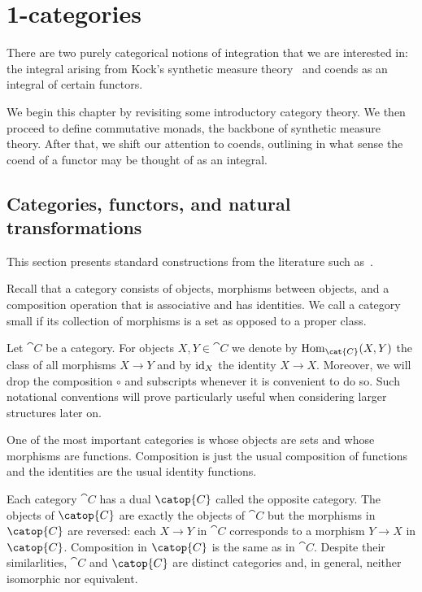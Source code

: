 \chapter{1-categories}\label{sec:synthetic_measure_theory_and_presheaves}

There are two purely categorical notions of integration that we are interested
in: the integral arising from Kock's synthetic measure theory~\cite{kock2011}
and coends as an integral of certain functors.

We begin this chapter by revisiting some introductory category theory. We then
proceed to define commutative monads, the backbone of synthetic measure theory.
After that, we shift our attention to coends, outlining in what sense the coend
of a functor may be thought of as an integral.

\section{Categories, functors, and natural transformations}\label{sec:categories}

This section presents standard constructions from the literature such as~\cite{maclane1997}.

Recall that a category consists of objects, morphisms between objects, and a
composition operation that is associative and has identities. We call a
category small if its collection of morphisms is a set as opposed to a proper
class.

Let $\cat{C}$ be a category. For objects $X,Y\in\cat{C}$ we denote by
$\Hom_{\cat{C}}(X,Y)$ the class of all morphisms $X\to Y$ and by $\operatorname{id}_X$ the
identity $X\to X$. Moreover, we will drop the composition $\circ$ and
subscripts whenever it is convenient to do so. Such notational conventions will
prove particularly useful when considering larger structures later on.

One of the most important categories is \Set{} whose objects are sets and whose
morphisms are functions. Composition is just the usual composition of functions
and the identities are the usual identity functions.

Each category $\cat{C}$ has a dual $\catop{C}$ called the opposite category.
The objects of $\catop{C}$ are exactly the objects of $\cat{C}$ but the
morphisms in $\catop{C}$ are reversed: each $X\to Y$ in $\cat{C}$
corresponds to a morphism $Y\to X$ in $\catop{C}$. Composition in $\catop{C}$
is the same as in $\cat{C}$. Despite their similarlities, $\cat{C}$ and
$\catop{C}$ are distinct categories and, in general, neither isomorphic
nor equivalent.

